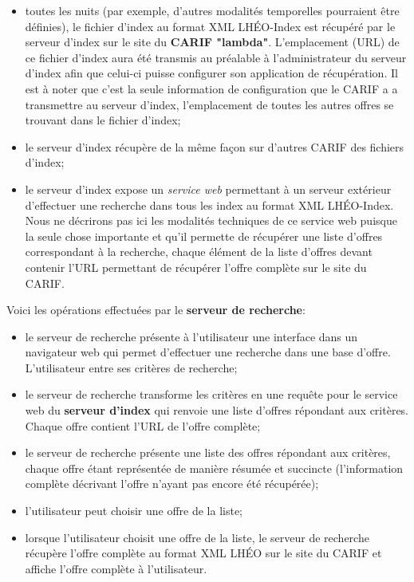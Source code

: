\begin{itemize} 
  
\item toutes les nuits (par exemple, d'autres modalités temporelles
  pourraient être définies), le fichier d'index au format XML
  LHÉO-Index est récupéré par le serveur d'index sur le site du
  \textbf{CARIF "lambda"}. L'emplacement (URL) de ce fichier d'index
  aura été transmis au préalable à l'administrateur du serveur d'index
  afin que celui-ci puisse configurer son application de
  récupération. Il est à noter que c'est la seule information de
  configuration que le CARIF a a transmettre au serveur d'index,
  l'emplacement de toutes les autres offres se trouvant dans le
  fichier d'index;

\item le serveur d'index récupère de la même façon sur d'autres CARIF
  des fichiers d'index;

\item le serveur d'index expose un \emph{service web} permettant à un
  serveur extérieur d'effectuer une recherche dans tous les index au
  format XML LHÉO-Index. Nous ne décrirons pas ici les modalités
  techniques de ce service web puisque la seule chose importante et
  qu'il permette de récupérer une liste d'offres correspondant à la
  recherche, chaque élément de la liste d'offres devant contenir l'URL
  permettant de récupérer l'offre complète sur le site du CARIF.
\end{itemize}

\medskip
\noindent Voici les opérations effectuées par le \textbf{serveur de recherche}:

\begin{itemize} 
\item le serveur de recherche présente à l'utilisateur une interface
  dans un navigateur web qui permet d'effectuer une recherche dans une
  base d'offre. L'utilisateur entre ses critères de recherche;
\item le serveur de recherche transforme les critères en une requête
  pour le service web du \textbf{serveur d'index} qui renvoie une
  liste d'offres répondant aux critères. Chaque offre contient l'URL
  de l'offre complète;
\item le serveur de recherche présente une liste des offres répondant
  aux critères, chaque offre étant représentée de manière résumée et
  succincte (l'information complète décrivant l'offre n'ayant pas
  encore été récupérée);
\item l'utilisateur peut choisir une offre de la liste;
\item lorsque l'utilisateur choisit une offre de la liste, le serveur
  de recherche récupère l'offre complète au format XML LHÉO sur le
  site du CARIF et affiche l'offre complète à l'utilisateur.
\end{itemize}
